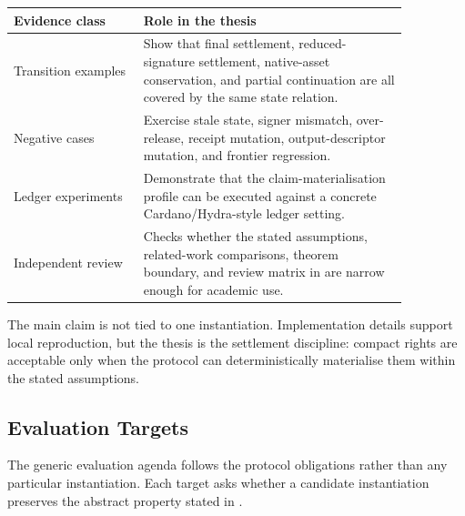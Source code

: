\documentclass[a4paper,11pt]{article}
\theoremstyle{definition}
\theoremstyle{plain}
\theoremstyle{remark}
\begin{document}
\begin{center}
\begin{tabular}{L{0.28\linewidth}L{0.58\linewidth}}
\toprule
\textbf{Evidence class} & \textbf{Role in the thesis}\\
\midrule
Transition examples & Show that final settlement, reduced-signature settlement,
native-asset conservation, and partial continuation are all covered by the same
state relation.\\
Negative cases & Exercise stale state, signer mismatch, over-release, receipt
mutation, output-descriptor mutation, and frontier regression.\\
Ledger experiments & Demonstrate that the claim-materialisation profile can be
executed against a concrete Cardano/Hydra-style ledger setting.\\
Independent review & Checks whether the stated assumptions, related-work
comparisons, theorem boundary, and review matrix in
 are narrow enough for academic use.\\
\bottomrule
\end{tabular}
\end{center}

The main claim is not tied to one instantiation. Implementation details support
local reproduction, but the thesis is the settlement discipline: compact rights
are acceptable only when the protocol can deterministically materialise them
within the stated assumptions.

\subsection{Evaluation Targets}
\label{sec:evaluation-targets}

The generic evaluation agenda follows the protocol obligations rather than any
particular instantiation. Each target asks whether a candidate instantiation preserves
the abstract property stated in .
\end{document}
